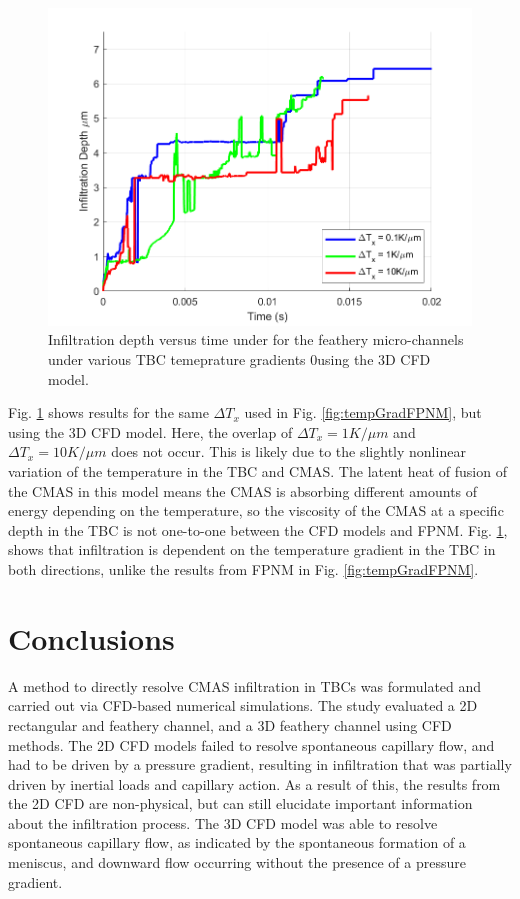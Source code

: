 \documentclass[%
 aip,
 amsmath,amssymb,
 reprint,%
]{revtex4-1}
\begin{document}
\begin{figure}[htp!]
    \centering
    \includegraphics[width=\linewidth]{Figures/tempGradStudyCFD.png}
    \caption{Infiltration depth versus time under for the feathery micro-channels under various TBC temeprature gradients 0using the 3D CFD model.}
    \label{fig:tempGradCFD}
\end{figure}

Fig. \ref{fig:tempGradCFD} shows results for the same $\Delta T_{x}$ used in Fig. \ref{fig:tempGradFPNM}, but using the 3D CFD model. Here, the overlap of $\Delta T_{x} = 1 K/\mu m$ and $\Delta T_{x} = 10 K/\mu m$ does not occur. This is likely due to the slightly nonlinear variation of the temperature in the TBC and CMAS. The latent heat of fusion of the CMAS in this model means the CMAS is absorbing different amounts of energy depending on the temperature, so the viscosity of the CMAS at a specific depth in the TBC is not one-to-one between the CFD models and FPNM.  Fig. \ref{fig:tempGradCFD}, shows that infiltration is dependent on the temperature gradient in the TBC in both directions, unlike the results from FPNM in Fig. \ref{fig:tempGradFPNM}. 

\section{Conclusions}
A method to directly resolve CMAS infiltration in TBCs was formulated and carried out via CFD-based numerical simulations. 
The study evaluated a 2D rectangular and feathery channel, and a 3D feathery channel using CFD methods. 
The 2D CFD models failed to resolve spontaneous capillary flow, and had to be driven by a pressure gradient, resulting in infiltration that was partially driven by inertial loads and capillary action.
As a result of this, the results from the 2D CFD are non-physical, but can still elucidate important information about the infiltration process.
The 3D CFD model was able to resolve spontaneous capillary flow, as indicated by the spontaneous formation of a meniscus, and downward flow occurring without the presence of a pressure gradient.
\end{document}
